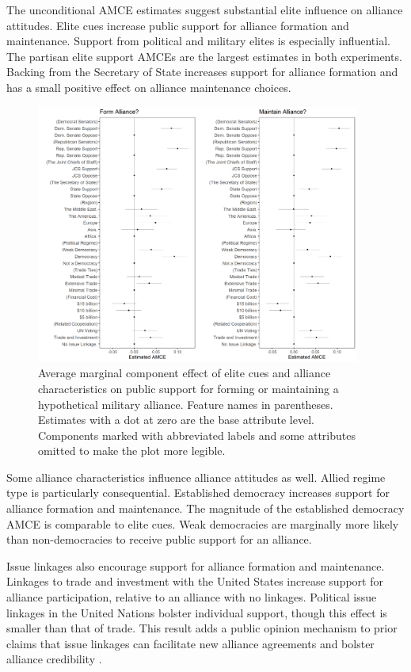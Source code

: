 \documentclass[12pt]{article}
\begin{document}
The unconditional AMCE estimates suggest substantial elite influence on alliance attitudes. 
Elite cues increase public support for alliance formation and maintenance. 
Support from political and military elites is especially influential.
The partisan elite support AMCEs are the largest estimates in both experiments.
Backing from the Secretary of State increases support for alliance formation and has a small positive effect on alliance maintenance choices. 


\begin{figure}
	\centering
		\includegraphics[width=0.95\textwidth]{../figures/joint-amce-plots.png}
	\caption{Average marginal component effect of elite cues and alliance characteristics on public support for forming or maintaining a hypothetical military alliance. Feature names in parentheses. Estimates with a dot at zero are the base attribute level. Components marked with abbreviated labels and some attributes omitted to make the plot more legible.}
	\label{fig:joint-plot}
\end{figure}


Some alliance characteristics influence alliance attitudes as well. 
Allied regime type is particularly consequential. 
Established democracy increases support for alliance formation and maintenance.
The magnitude of the established democracy AMCE is comparable to elite cues.   
Weak democracies are marginally more likely than non-democracies to receive public support for an alliance.


Issue linkages also encourage support for alliance formation and maintenance. 
Linkages to trade and investment with the United States increase support for alliance participation, relative to an alliance with no linkages. 
Political issue linkages in the United Nations bolster individual support, though this effect is smaller than that of trade. 
This result adds a public opinion mechanism to prior claims that issue linkages can facilitate new alliance agreements \citep{Poast2012} and bolster alliance credibility \citep{Poast2013}. 
\end{document}

